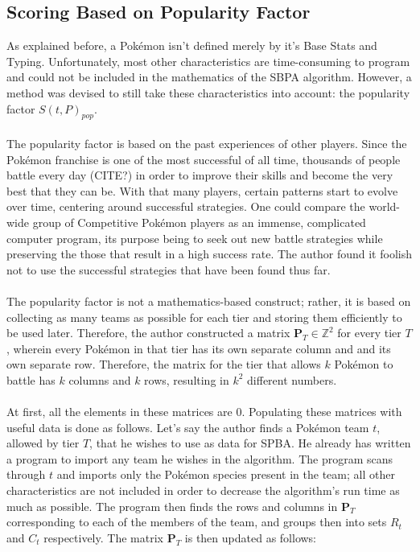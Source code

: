 \documentclass{article}
\begin{document}
\subsection{Scoring Based on Popularity Factor}
As explained before, a Pok\'emon isn't defined merely by it's Base Stats and Typing. Unfortunately, most other characteristics are time-consuming to program and could not be included in the mathematics of the SBPA algorithm. However, a method was devised to still take these characteristics into account: the popularity factor $S(t,P)_{pop}$.\\\\
The popularity factor is based on the past experiences of other players. Since the Pok\'emon franchise is one of the most successful of all time, thousands of people battle every day (CITE?) in order to improve their skills and become the very best that they can be. With that many players, certain patterns start to evolve over time, centering around successful strategies. One could compare the world-wide group of Competitive Pok\'emon players as an immense, complicated computer program, its purpose being to seek out new battle strategies while preserving the those that result in a high success rate. The author found it foolish not to use the successful strategies that have been found thus far.\\\\
The popularity factor is not a mathematics-based construct; rather, it is based on collecting as many teams as possible for each tier and storing them efficiently to be used later. Therefore, the author constructed a matrix $\textbf{P}_T\in\mathbb{Z}^2$ for every tier $T$, wherein every Pok\'emon in that tier has its own separate column and and its own separate row. Therefore, the matrix for the tier that allows $k$ Pok\'emon to battle has $k$ columns and $k$ rows, resulting in $k^2$ different numbers.\\\\
At first, all the elements in these matrices are 0. Populating these matrices with useful data is done as follows.
Let's say the author finds a Pok\'emon team $t$, allowed by tier $T$, that he wishes to use as data for SPBA. He already has written a program to import any team he wishes in the algorithm. The program scans through $t$ and imports only the Pok\'emon species present in the team; all other characteristics are not included in order to decrease the algorithm's run time as much as possible. The program then finds the rows and columns in $\textbf{P}_T$ corresponding to each of the members of the team, and groups then into sets $R_t$ and $C_t$ respectively. The matrix $\textbf{P}_T$ is then updated as follows:
\end{document}
